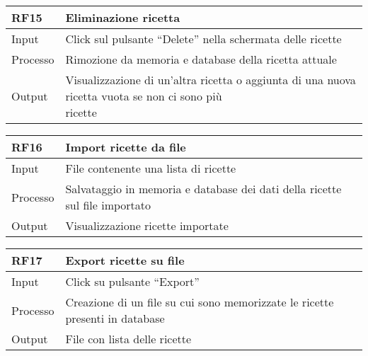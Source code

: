 \begin{table}[H]
    \begin{flushleft}
      \begin{tabular}{l|l}
        \toprule
        \textbf{RF15} & \textbf{Eliminazione ricetta}\\
        \midrule
        Input & Click sul pulsante “Delete” nella schermata delle ricette\\
        Processo & Rimozione da memoria e database della ricetta attuale\\
        Output & \makecell{Visualizzazione di un’altra ricetta o aggiunta di una nuova ricetta vuota se non ci sono più \\ ricette}\\
        \bottomrule
      \end{tabular}
    \end{flushleft}
\end{table}

\begin{table}[H]
    \begin{flushleft}
      \begin{tabular}{l|l}
        \toprule
        \textbf{RF16} & \textbf{Import ricette da file}\\
        \midrule
        Input & File contenente una lista di ricette\\
        Processo & Salvataggio in memoria e database dei dati della ricette sul file importato\\
        Output & Visualizzazione ricette importate\\
        \bottomrule
      \end{tabular}
    \end{flushleft}
\end{table}

\begin{table}[H]
    \begin{flushleft}
      \begin{tabular}{l|l}
        \toprule
        \textbf{RF17} & \textbf{Export ricette su file}\\
        \midrule
        Input & Click su pulsante “Export”\\
        Processo & Creazione di un file su cui sono memorizzate le ricette presenti in database\\
        Output & File con lista delle ricette\\
        \bottomrule
      \end{tabular}
    \end{flushleft}
\end{table}

